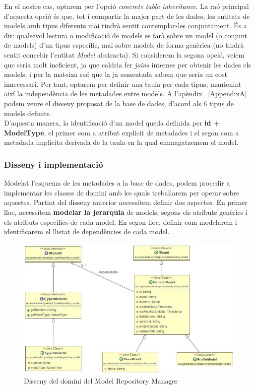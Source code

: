 En el nostre cas, optarem per l'opció \textit{concrete table inheritance}. La raó principal d'aquesta opció és que, tot i compartir la major part de les dades, les entitats de models amb tipus diferents mai tindrà sentit contemplar-les conjuntament. És a dir: qualsevol lectura o modificació de models es farà sobre un model (o conjunt de models) d'un tipus específic, mai sobre models de forma genèrica (no tindrà sentit concebir l'entitat \textit{Model} abstracta). Si considerem la segona opció, veiem que seria molt ineficient, ja que caldria fer \textit{joins} internes per obtenir les dades els models, i per la mateixa raó que la ja esmentada sabem que seria un cost innecessari. Per tant, optarem per definir una taula per cada tipus, mantenint així la independència de les metadades entre models. A l'apèndix ~\ref{AppendixA} podem veure el disseny proposat de la base de dades, d'acord als 6 tipus de models definits.\\

D'aquesta manera, la identificació d'un model queda definida per \textbf{id + ModelType}, el primer com a atribut explícit de metadades i el segon com a metadada implícita derivada de la taula en la qual emmagatzemem el model.

\subsubsection{Disseny i implementació}

Modelat l'esquema de les metadades a la base de dades, podem procedir a implementar les classes de domini amb les quals treballarem per operar sobre aquestes. Partint del disseny anterior necessitem definir dos aspectes. En primer lloc, necessitem \textbf{modelar la jerarquia} de models, segons els atributs genèrics i els atributs específics de cada model. En segon lloc, definir com modelarem i identificarem el llistat de dependències de cada model.\\

\begin{figure}
\centering
\includegraphics[width=14cm]{Figures/Figure21}
\decoRule
\caption{Disseny del domini del Model Repository Manager}
\label{fig:Figura21}
\end{figure}

